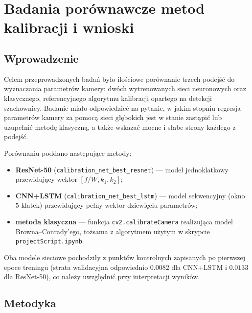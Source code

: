 \documentclass[12pt,a4paper]{report}
\begin{document}
\chapter{Badania porównawcze metod kalibracji i wnioski}
\label{chap:badania-wnioski}

\section{Wprowadzenie}
Celem przeprowadzonych badań było ilościowe porównanie trzech podejść do wyznaczania
parametrów kamery: dwóch wytrenowanych sieci neuronowych oraz klasycznego, referencyjnego
algorytmu kalibracji opartego na detekcji szachownicy. Badanie miało odpowiedzieć na pytanie,
w jakim stopniu regresja parametrów kamery za pomocą sieci głębokich jest w stanie zastąpić
lub uzupełnić metodę klasyczną, a także wskazać mocne i słabe strony każdego z podejść.

Porównaniu poddano następujące metody:
\begin{itemize}[leftmargin=*]
  \item \textbf{ResNet-50} (\texttt{calibration\_net\_best\_resnet}) --- model jednoklatkowy
        przewidujący wektor $[f/W, k_1, k_2]$;
  \item \textbf{CNN+LSTM} (\texttt{calibration\_net\_best\_lstm}) --- model sekwencyjny (okno
        $5$ klatek) przewidujący pełny wektor dziewięciu parametrów;
  \item \textbf{metoda klasyczna} --- funkcja \texttt{cv2.calibrateCamera} realizująca model
        Browna--Conrady'ego, tożsama z algorytmem użytym w skrypcie \texttt{projectScript.ipynb}.
\end{itemize}

Oba modele sieciowe pochodziły z punktów kontrolnych zapisanych po pierwszej epoce treningu
(strata walidacyjna odpowiednio $0.0082$ dla CNN+LSTM i $0.0133$ dla ResNet-50), co należy
uwzględnić przy interpretacji wyników.

\section{Metodyka}
\end{document}
